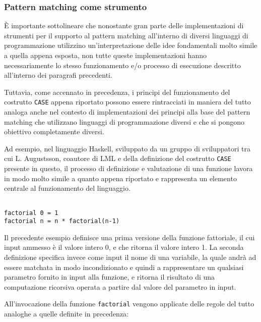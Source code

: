 \subsubsection{Pattern matching come strumento}

È importante sottolineare che nonostante gran parte delle implementazioni di
strumenti per il supporto al pattern matching all’interno di diversi linguaggi
di programmazione utilizzino un’interpretazione delle idee fondamentali molto
simile a quella appena esposta, non tutte queste implementazioni hanno
necessariamente lo stesso funzionamento e/o processo di esecuzione descritto
all'interno dei paragrafi precedenti.

Tuttavia, come accennato in precedenza, i principi del funzionamento del
costrutto \texttt{CASE} appena riportato possono essere rintracciati in maniera
del tutto analoga anche nel contesto di implementazioni dei principi alla base
del pattern matching che utilizzano linguaggi di programmazione diversi e che si
pongono obiettivo completamente diversi.

Ad esempio, nel linguaggio Haskell, sviluppato da un gruppo di sviluppatori tra
cui L. Augustsson, coautore di LML e della definizione del costrutto
\texttt{CASE} presente in questo, il processo di definizione e valutazione di
una funzione lavora in modo molto simile a quanto appena riportato e rappresenta
un elemento centrale al funzionamento del linguaggio.

\begin{lstlisting}[caption=Esempio di definizione di una funzione Haskell naive
per il calcolo del fattoriale]

factorial 0 = 1
factorial n = n * factorial(n-1)

\end{lstlisting}

Il precedente esempio definisce una prima versione della funzione fattoriale, il
cui input ammesso è il valore intero 0, e che ritorna il valore intero 1. La
seconda definizione specifica invece come input il nome di una variabile, la
quale andrà ad essere matchata in modo incondizionato e quindi a rappresentare
un qualsiasi parametro fornito in input alla funzione, e ritorna il risultato di
una computazione ricorsiva operata a partire dal valore del parametro in input.

All’invocazione della funzione \texttt{factorial} vengono applicate delle regole
del tutto analoghe a quelle definite in precedenza:


